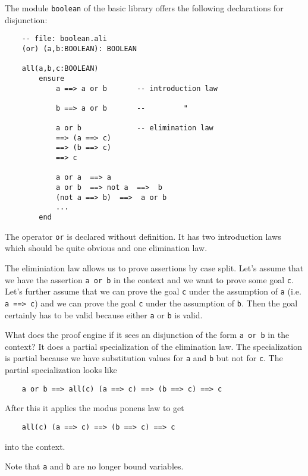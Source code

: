 The module \lstinline!boolean! of the basic library offers the following declarations
for disjunction:

\begin{lstlisting}
    -- file: boolean.ali
    (or) (a,b:BOOLEAN): BOOLEAN

    all(a,b,c:BOOLEAN)
        ensure
            a ==> a or b       -- introduction law

            b ==> a or b       --         "

            a or b             -- elimination law
            ==> (a ==> c)
            ==> (b ==> c)
            ==> c

            a or a  ==> a
            a or b  ==> not a  ==>  b
            (not a ==> b)  ==>  a or b
            ...
        end
\end{lstlisting}

The operator \lstinline!or! is declared without definition. It has two introduction laws
which should be quite obvious and one elimination law.

The eliminiation law allows us to prove assertions by case split. Let's assume
that we have the assertion \lstinline!a or b! in the context and we want to
prove some goal \lstinline!c!. Let's further assume that we can prove the goal
\lstinline!c! under the assumption of \lstinline!a! (i.e. \lstinline!a ==> c!)
and we can prove the goal \lstinline!c! under the assumption of
\lstinline!b!. Then the goal certainly has to be valid because either
\lstinline!a!  or \lstinline!b! is valid.

What does the proof engine if it sees an disjunction of the form
\lstinline!a or b! in the context? It does a partial specialization of the
elimination law. The specialization is partial because we have substitution
values for \lstinline!a! and \lstinline!b!  but not for \lstinline!c!. The
partial specialization looks like

\begin{lstlisting}
    a or b ==> all(c) (a ==> c) ==> (b ==> c) ==> c
\end{lstlisting}

After this it applies the modus ponens law to get
\begin{lstlisting}
    all(c) (a ==> c) ==> (b ==> c) ==> c
\end{lstlisting}
into the context.


Note that \lstinline!a! and \lstinline!b! are no longer bound variables.





